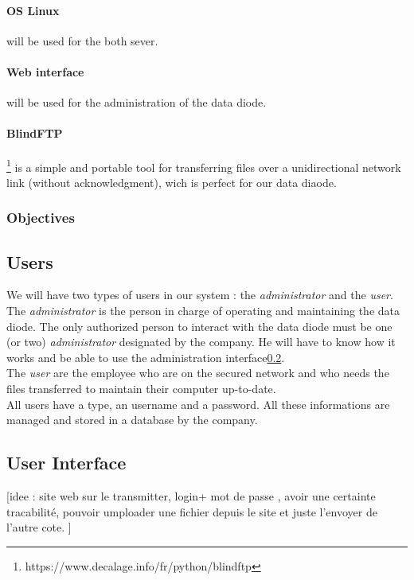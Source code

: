 \documentclass[a4paper,10pt]{article}
\begin{document}
\paragraph{OS Linux} will be used for the both sever.

\paragraph{Web interface} will be used for the administration of the data diode.

\paragraph{BlindFTP}\footnote{https://www.decalage.info/fr/python/blindftp} is a simple and portable tool for transferring files over a unidirectional network link (without acknowledgment), wich is perfect for our data diaode.

\subsubsection{Objectives}
\subsection{Users} 
We will have two types of users in our system : the \textit{administrator} and the \textit{user}.\\

The \textit{administrator} is the person in charge of operating and maintaining the data diode. The only authorized person to interact with the data diode must be one (or two) \textit{administrator} designated by the company. He will have to know how it works and be able to use the administration interface\ref{UI}.\\

The \textit{user} are the employee who are on the secured network and who needs the files
transferred to maintain their computer up-to-date.\\

All users have a type, an username and a password. All these informations are
managed and stored in a database by the company.
\subsection{User Interface}\label{UI}


[idee : site web sur le transmitter, login+ mot de passe , avoir une certainte tracabilité, pouvoir umploader une fichier depuis le site et juste l'envoyer de l'autre cote. ]\\
\end{document}
